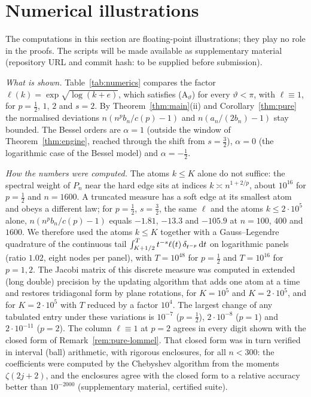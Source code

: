 
\makeatletter
{}
\makeatother
\providecommand{\Ath}[1]{\textup{(A$_{#1}$)}}

\section{Numerical illustrations}\label{sec:numerics}

The computations in this section are floating-point illustrations; they play no role in the proofs. The scripts will
be made available as supplementary material (repository URL and commit hash: to be supplied before submission).

\emph{What is shown.} Table~\ref{tab:numerics} compares the factor $\ell(k)=\exp\sqrt{\log(k+e)}$, which satisfies
\Ath{\vartheta} for every $\vartheta<\pi$, with $\ell\equiv1$, for $p=\frac12$, $1$, $2$ and $s=2$. By Theorem~\ref{thm:main}(ii)
and Corollary~\ref{thm:pure} the normalised deviations $n(n^pb_n/c(p)-1)$ and $n(a_n/(2b_n)-1)$ stay bounded. The Bessel
orders are $\alpha=1$ (outside the window of Theorem~\ref{thm:engine}, reached through the shift from $s=\frac32$),
$\alpha=0$ (the logarithmic case of the Bessel model) and $\alpha=-\frac12$.

\emph{How the numbers were computed.} The atoms $k\le K$ alone do not suffice: the spectral weight of $P_n$ near the hard
edge sits at indices $k\asymp n^{1+2/p}$, about $10^{16}$ for $p=\frac12$ and $n=1600$. A truncated measure has a soft edge
at its smallest atom and obeys a different law; for $p=\frac12$, $s=\frac32$, the same $\ell$ and the atoms
$k\le2\cdot10^5$ alone, $n(n^pb_n/c(p)-1)$ equals $-1.81$, $-13.3$ and $-105.9$ at $n=100$, $400$ and $1600$. We
therefore used the atoms $k\le K$ together with a Gauss--Legendre quadrature of the continuous tail
$\int_{K+1/2}^{T}t^{-s}\ell(t)\,\delta_{t^{-p}}\,\mathrm{d} t$ on logarithmic panels (ratio $1.02$, eight nodes per panel), with
$T=10^{48}$ for $p=\frac12$ and $T=10^{16}$ for $p=1,2$. The Jacobi matrix of this discrete measure was computed in
extended (long double) precision by the updating algorithm that adds one atom at a time and restores tridiagonal form by
plane rotations, for $K=10^5$ and $K=2\cdot10^5$, and for $K=2\cdot10^5$ with $T$ reduced by a factor $10^4$. The largest
change of any tabulated entry under these variations is $10^{-7}$ ($p=\frac12$), $2\cdot10^{-8}$ ($p=1$) and
$2\cdot10^{-11}$ ($p=2$). The column $\ell\equiv1$ at $p=2$ agrees in every digit shown with the closed form of
Remark~\ref{rem:pure-lommel}. That closed form was in turn verified in interval (ball) arithmetic, with rigorous
enclosures, for all $n<300$: the coefficients were computed by the Chebyshev algorithm from the moments $\zeta(2j+2)$,
and the enclosures agree with the closed form to a relative accuracy better than $10^{-2000}$ (supplementary
material, certified suite).

